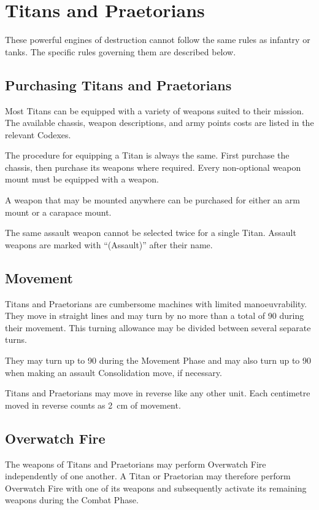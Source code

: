 \section{Titans and Praetorians}

These powerful engines of destruction cannot follow the same rules as infantry or tanks. The specific rules governing them are described below.

\subsection{Purchasing Titans and Praetorians}

Most Titans can be equipped with a variety of weapons suited to their mission. The available chassis, weapon descriptions, and army points costs are listed in the relevant Codexes.

The procedure for equipping a Titan is always the same. First purchase the chassis, then purchase its weapons where required. Every non-optional weapon mount must be equipped with a weapon.

A weapon that may be mounted anywhere can be purchased for either an arm mount or a carapace mount.

The same assault weapon cannot be selected twice for a single Titan. Assault weapons are marked with ``(Assault)'' after their name.

\subsection{Movement}

Titans and Praetorians are cumbersome machines with limited manoeuvrability. They move in straight lines and may turn by no more than a total of 90\textdegree{} during their movement. This turning allowance may be divided between several separate turns.

They may turn up to 90\textdegree{} during the Movement Phase and may also turn up to 90\textdegree{} when making an assault Consolidation move, if necessary.

Titans and Praetorians may move in reverse like any other unit. Each centimetre moved in reverse counts as 2~cm of movement.

\subsection{Overwatch Fire}

The weapons of Titans and Praetorians may perform Overwatch Fire independently of one another. A Titan or Praetorian may therefore perform Overwatch Fire with one of its weapons and subsequently activate its remaining weapons during the Combat Phase.

